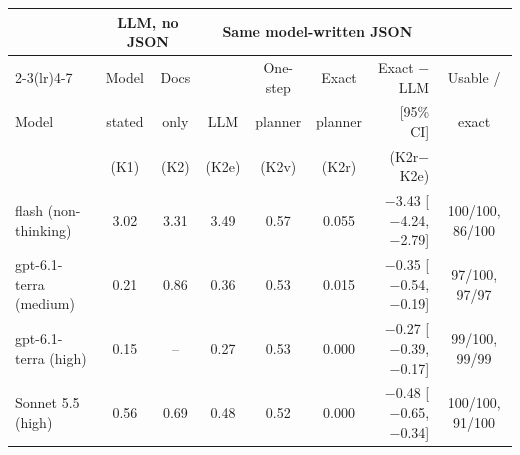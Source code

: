 \begin{tabular}{@{}lcccccrc@{}}
\toprule
 & \multicolumn{2}{c}{LLM, no JSON} & \multicolumn{4}{c}{Same model-written JSON} & \\
\cmidrule(lr){2-3}\cmidrule(lr){4-7}
 & Model & Docs & & One-step & Exact & Exact $-$ LLM & Usable / \\
Model & stated & only & LLM & planner & planner & [95\% CI] & exact \\
 & (K1) & (K2) & (K2e) & (K2v) & (K2r) & (K2r$-$K2e) & \\
\midrule
flash (non-thinking) & 3.02 & 3.31 & 3.49 & 0.57 & 0.055 & $-$3.43 [$-$4.24, $-$2.79] & 100/100, 86/100 \\
gpt-6.1-terra (medium) & 0.21 & 0.86 & 0.36 & 0.53 & 0.015 & $-$0.35 [$-$0.54, $-$0.19] & 97/100, 97/97 \\
gpt-6.1-terra (high) & 0.15 & -- & 0.27 & 0.53 & 0.000 & $-$0.27 [$-$0.39, $-$0.17] & 99/100, 99/99 \\
Sonnet 5.5 (high) & 0.56 & 0.69 & 0.48 & 0.52 & 0.000 & $-$0.48 [$-$0.65, $-$0.34] & 100/100, 91/100 \\
\bottomrule
\end{tabular}
